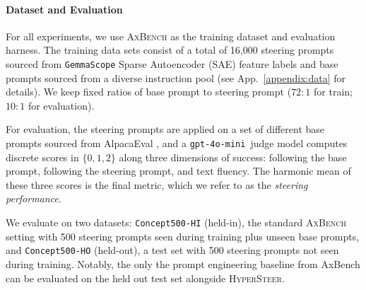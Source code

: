 \documentclass[11pt]{article}
\newcommand{\methodname}{\textsc{HyperSteer}}
\newcommand{\gpt}{\texttt{gpt-4o-mini}}
\begin{document}

\paragraph{Dataset and Evaluation} For all experiments, we use \textsc{AxBench} \cite{wu2025axbenchsteeringllmssimple} as the training dataset and evaluation harness. The training data sets consist of a total of 16,000 steering prompts sourced from \texttt{GemmaScope} Sparse Autoencoder (SAE) feature labels \cite{DBLP:journals/corr/abs-2408-05147} and base prompts sourced from a diverse instruction pool (see App.~\ref{appendix:data} for details). We keep fixed ratios of base prompt to steering prompt ($72:1$ for train; $10:1$ for evaluation).

For evaluation, the steering prompts are applied on a set of different base prompts sourced from AlpacaEval \cite{alpaca_eval}, and a \gpt\ judge model \cite{openai2024gpt4ocard} computes discrete scores in $\{0,1,2\}$ along three dimensions of success: following the base prompt, following the steering prompt, and text fluency. The harmonic mean of these three scores is the final metric, which we refer to as the \textit{steering performance}. 

We evaluate on two datasets: \texttt{Concept500-HI} (held-in), the standard \textsc{AxBench} setting with 500 steering prompts seen during training plus unseen base prompts, and \texttt{Concept500-HO} (held-out), a test set with 500 steering prompts not seen during training. Notably, the only the prompt engineering baseline from AxBench can be evaluated on the held out test set alongside \methodname.
\end{document}
